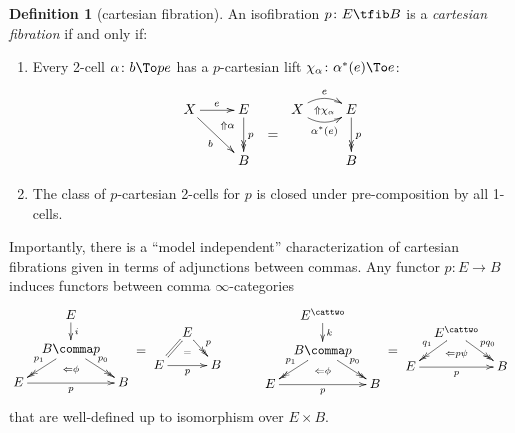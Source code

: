 \documentclass[12pt,reqno]{amsart}
\theoremstyle{plain}
\theoremstyle{definition}
\newtheorem{defn}[thm]{Definition}
\theoremstyle{remark}
\numberwithin{equation}{subsection}
\begin{document}
\begin{defn}[cartesian fibration]\label{defn:cart-fib}
An isofibration  $p\colon E\tfib B$ is a {\em cartesian fibration\/} if and only if:
\begin{enumerate}[label=(\roman*)]
  \item Every 2-cell $\alpha \colon b \To pe$ has a $p$-cartesian lift $\chi_\alpha \colon \alpha^*(e)\To e$:
\[\vcenter{\xymatrix{ X \ar[r]^{e} \ar[dr]_b & E \ar@{->>}[d]^{p} \ar@{}[dl]|(.3){\Uparrow \alpha} \ar@{}[dr]|{\displaystyle ~=} & X \ar@/^2ex/[r]^{e} \ar@/_2ex/[r]_{\alpha^*(e)} \ar@{}[r]|{\Uparrow \chi_\alpha } &E \ar@{->>}[d]^{p}  \\ & B & & B}} \]
  \item The class of $p$-cartesian 2-cells for $p$ is closed under pre-composition by all 1-cells.
  \end{enumerate}
\end{defn}

Importantly, there is a ``model independent'' characterization of cartesian fibrations given in terms of adjunctions between commas. Any functor $p \colon E \to B$ induces functors between comma $\infty$-categories 
  \begin{equation*}
 \vcenter{\xymatrix@C=0.8em@R=1.2em{
    & {E}\ar[d]^-{i} & \\
    & {B\comma p}\ar@{->>}[dl]_{p_1}\ar@{->>}[dr]^{p_0} & \\
    {E}\ar[rr]_{p} && {B}
    \ar@{} "2,2";"3,2" |(0.6){\Leftarrow\phi}
  }} = 
  \vcenter{\xymatrix@C=0.8em@R=1.2em{
    & {E}\ar@{=}[dl]\ar@{->>}[dr]^{p} & \\
    {E}\ar[rr]_{p} && {B}
    \ar@{} "1,2";"2,2" |(0.6){=}
  }}   
  \mkern50mu
  \vcenter{\xymatrix@C=0.8em@R=1.2em{
    & {E^\cattwo}\ar[d]^-{k} & \\
    & {B\comma p}\ar@{->>}[dl]_{p_1}\ar@{->>}[dr]^{p_0} & \\
    {E}\ar[rr]_{p} && {B}
    \ar@{} "2,2";"3,2" |(0.6){\Leftarrow\phi}
  }} = 
  \vcenter{\xymatrix@C=0.8em@R=1.2em{
    & {E^\cattwo}\ar@{->>}_{q_1}[dl]\ar@{->>}[dr]^{pq_0} & \\
    {E}\ar[rr]_{p} && {B}
    \ar@{} "1,2";"2,2" |(0.6){\Leftarrow p\psi}
  }}
  \end{equation*}
 that are well-defined up to isomorphism over $E \times B$. 
\end{document}
